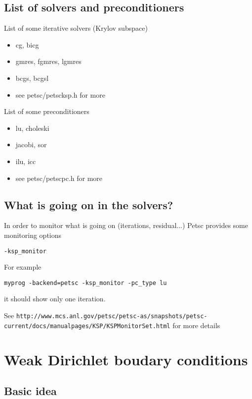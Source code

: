 \subsection{List of solvers and preconditioners}
\label{sec:list-solv-prec}

List of some iterative solvers (Krylov subspace)
\begin{itemize}
\item cg, bicg
\item gmres, fgmres, lgmres
\item bcgs, bcgsl
\item see petsc/petscksp.h for more
\end{itemize}

List of some preconditioners
\begin{itemize}
\item lu, choleski
\item jacobi, sor
\item ilu, icc
\item see petsc/petscpc.h for more
\end{itemize}

\subsection{What is going on in the solvers?}
\label{sec:what-going-solvers}

In order to monitor what is going on (iterations, residual...) Petsc
provides some monitoring options
\begin{verbatim}
-ksp_monitor
\end{verbatim}
For example
\begin{verbatim}
myprog -backend=petsc -ksp_monitor -pc_type lu
\end{verbatim}
it should show only one iteration.

See {\tiny\texttt{http://www.mcs.anl.gov/petsc/petsc-as/snapshots/petsc-current/docs/manualpages/KSP/KSPMonitorSet.html}} for more details



\section{Weak Dirichlet boudary conditions}
\label{sec:weak-dirichl-boud}

\subsection{Basic idea}

